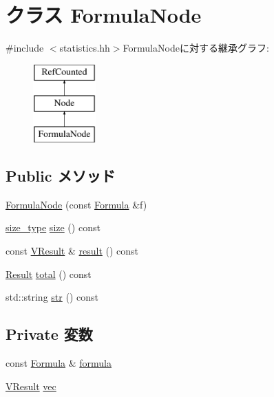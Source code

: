 \hypertarget{classStats_1_1FormulaNode}{
\section{クラス FormulaNode}
\label{classStats_1_1FormulaNode}
}


{\ttfamily \#include $<$statistics.hh$>$}FormulaNodeに対する継承グラフ:\begin{figure}[H]
\begin{center}
\leavevmode
\includegraphics[height=3cm]{classStats_1_1FormulaNode}
\end{center}
\end{figure}
\subsection*{Public メソッド}
\begin{DoxyCompactItemize}
\item 
\hyperlink{classStats_1_1FormulaNode_a605459c1f772357240e8bacc151a0b18}{FormulaNode} (const \hyperlink{classStats_1_1Formula}{Formula} \&f)
\item 
\hyperlink{namespaceStats_ada51e68d31936547d3729c82daf6b7c6}{size\_\-type} \hyperlink{classStats_1_1FormulaNode_a503ab01f6c0142145d3434f6924714e7}{size} () const 
\item 
const \hyperlink{classstd_1_1vector}{VResult} \& \hyperlink{classStats_1_1FormulaNode_aba312f9e3431b1652f8b3ddf3fe105dc}{result} () const 
\item 
\hyperlink{namespaceStats_ad874d2cfd4b4a29ebd480bb2e67f20ae}{Result} \hyperlink{classStats_1_1FormulaNode_a35c6e2ed3fc81b40d69052a062113ead}{total} () const 
\item 
std::string \hyperlink{classStats_1_1FormulaNode_a1b9b8885b0880fc4ddf9a2c7d1ca3dc4}{str} () const 
\end{DoxyCompactItemize}
\subsection*{Private 変数}
\begin{DoxyCompactItemize}
\item 
const \hyperlink{classStats_1_1Formula}{Formula} \& \hyperlink{classStats_1_1FormulaNode_aec67d3b896ecac7252bcd4160202b641}{formula}
\item 
\hyperlink{classstd_1_1vector}{VResult} \hyperlink{classStats_1_1FormulaNode_a539785a2cf8aa37d52a6023051f9f797}{vec}
\end{DoxyCompactItemize}


